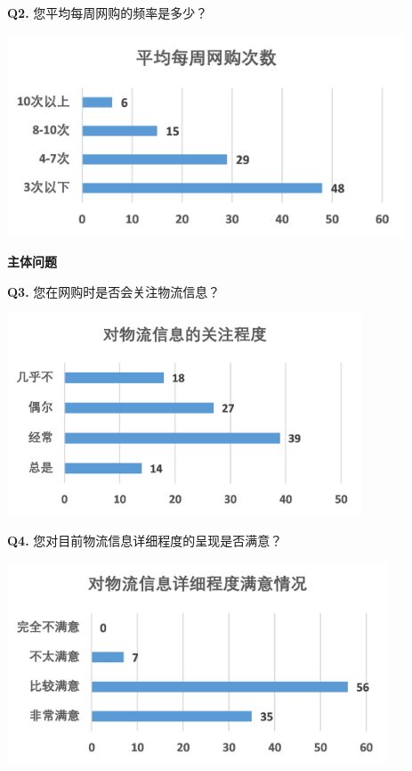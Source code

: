 \documentclass[12pt]{article}
\begin{document}
\noindent \textbf{Q2.} 您平均每周网购的频率是多少？
\begin{center}
	\includegraphics[height=6cm]{survey2.png}
\end{center}

\noindent \textbf{主体问题}

\noindent \textbf{Q3.} 您在网购时是否会关注物流信息？
\begin{center}
	\includegraphics[height=6cm]{survey3.png}
\end{center}

\noindent \textbf{Q4.} 您对目前物流信息详细程度的呈现是否满意？
\begin{center}
	\includegraphics[height=6cm]{survey4.png}
\end{center}
\end{document}
